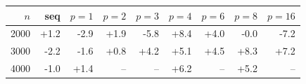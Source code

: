 \begin{tabular}{rrrrrrrrr}
\toprule
$n$ & seq & $p{=}1$ & $p{=}2$ & $p{=}3$ & $p{=}4$ & $p{=}6$ & $p{=}8$ & $p{=}16$ \\
\midrule
2000 & +1.2 & -2.9 & +1.9 & -5.8 & +8.4 & +4.0 & -0.0 & -7.2 \\
3000 & -2.2 & -1.6 & +0.8 & +4.2 & +5.1 & +4.5 & +8.3 & +7.2 \\
4000 & -1.0 & +1.4 & -- & -- & +6.2 & -- & +5.2 & -- \\
\bottomrule
\end{tabular}
